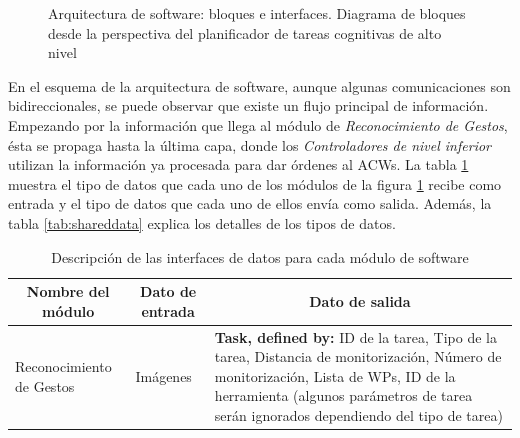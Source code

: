\documentclass[fontsize=11pt, English=false, Español=true, Myfinal=true, twoside, numbers=noenddot]{scrbook}
\begin{document}
{\begin{figure}[ht]
{}
	\caption{Arquitectura de software: bloques e interfaces. Diagrama de bloques desde la perspectiva del planificador de tareas cognitivas de alto nivel}
	\label{fig:NodeDiagram}
\end{figure}

En el esquema de la arquitectura de software, aunque algunas comunicaciones son bidireccionales, se puede observar que existe un flujo principal de información. Empezando por la información que llega al módulo de \emph{Reconocimiento de Gestos}, ésta se propaga hasta la última capa, donde los \emph{Controladores de nivel inferior} utilizan la información ya procesada para dar órdenes al \glspl{ACW}. La tabla \ref{tab:interfaces} muestra el tipo de datos que cada uno de los módulos de la figura \ref{fig:NodeDiagram} recibe como entrada y el tipo de datos que cada uno de ellos envía como salida. Además, la tabla \ref{tab:shareddata} explica los detalles de los tipos de datos. 

\begin{table}[ht]
    \centering
    \caption{Descripción de las interfaces de datos para cada módulo de software}
    \label{tab:interfaces}
    \small
    \begin{tabular}{|p{}|p{}|p{}|}
      \hline
      \multicolumn{1}{|c}{\textbf{Nombre del módulo}} & \multicolumn{1}{|c|}{\textbf{Dato de entrada}} & \multicolumn{1}{c|}{\textbf{Dato de salida}}\\ \hline \hline
      Reconocimiento de Gestos & Imágenes & \textbf{Task, defined by:} ID de la tarea, Tipo de la tarea, Distancia de monitorización, Número de monitorización, Lista de WPs, ID de la herramienta (algunos parámetros de tarea serán ignorados dependiendo del tipo de tarea) \\ \hline
      

\end{tabular}
\end{table}}
\end{document}
